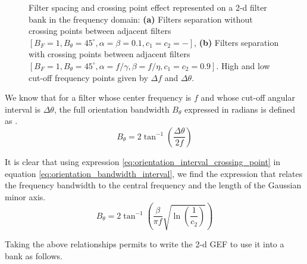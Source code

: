 \documentclass[journal]{IEEEtran}
\newcommand{\captext}[1]{\small{\textbf{\textsf{#1}}}}
\begin{document}
\begin{figure}[!ht]
\centering
\caption{Filter spacing and crossing point effect represented on a 2-d filter bank in the frequency domain: \captext{(a)} Filters separation without crossing points between adjacent filters $[B_F=1, B_{\theta} = 45^{\circ}, \alpha=\beta=0.1, c_1=c_2=-]$, \captext{(b)} Filters separation with crossing points between adjacent filters $[B_F=1, B_{\theta} = 45^{\circ}, \alpha=f/\gamma, \beta=f/\eta, c_1=c_2=0.9]$. High and low cut-off frequency points given by $\Delta f$ and $\Delta \theta$.}\label{fig:2d_filterbank_spacing}
\end{figure}

We know that for a filter whose center frequency is $f$ and whose cut-off angular interval is $\Delta \theta$, the full orientation bandwidth $B_\theta$ expressed in radians is defined as \cite{Daugman:JOSA:1985}.
\begin{equation}\label{eq:orientation_bandwidth_interval}
    B_{\theta} = 2 \tan^{-1} \left( \frac{\Delta \theta}{2f} \right)
\end{equation}

It is clear that using expression \eqref{eq:orientation_interval_crossing_point} in equation \eqref{eq:orientation_bandwidth_interval}, we find the expression that relates the frequency bandwidth to the central frequency and the length of the Gaussian minor axis.
\begin{equation}\label{eq:orientation_bandwidth}
    B_{\theta} = 2 \tan^{-1} \left( \frac{\beta}{\pi f} \sqrt{\ln \left(\frac{1}{c_2}\right)} \right)
\end{equation}

Taking the above relationships permits to write the 2-d GEF to use it into a bank as follows. 
\end{document}
